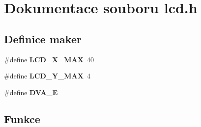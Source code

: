 \section{Dokumentace souboru lcd.h}
\label{lcd_8h}
\subsection*{Definice maker}
\begin{DoxyCompactItemize}
\item 
\#define {\bf LCD\_\-X\_\-MAX}~40
\item 
\#define {\bf LCD\_\-Y\_\-MAX}~4
\item 
\#define {\bf DVA\_\-E}
\end{DoxyCompactItemize}
\subsection*{Funkce}
